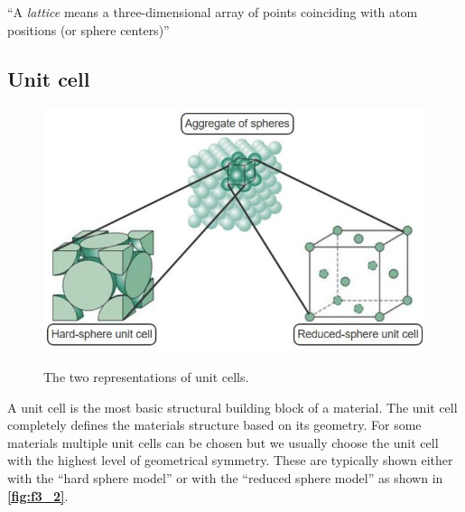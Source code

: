 \begin{definition}[Lattice]
  ``A \textit{lattice} means a three-dimensional array of points coinciding with atom positions (or sphere centers)''
\end{definition}

\subsection{Unit cell}
\begin{figure} [ht]
  \centering
  \caption{The two representations of unit cells.}
  \includegraphics[width=0.5\linewidth]{./figures/f3_2.png}
  \label{fig:f3_2}
\end{figure}
\begin{definition}
  A unit cell is the most basic structural building block of a material. The unit cell completely defines the materials structure based on its geometry. For some materials multiple unit cells can be chosen but we usually choose the unit cell with the highest level of geometrical symmetry. These are typically shown either with the ``hard sphere model'' or with the ``reduced sphere model'' as shown in \textbf{\autoref{fig:f3_2}}.
\end{definition}


